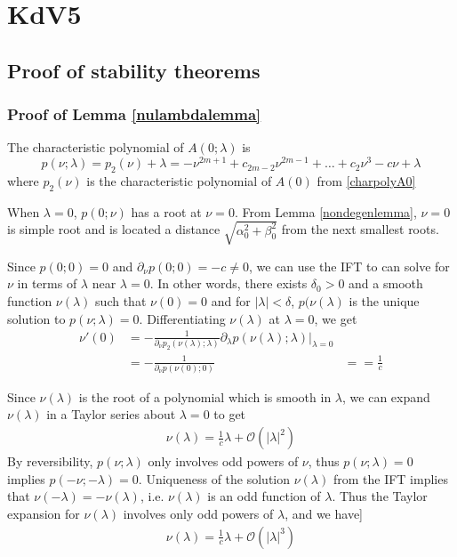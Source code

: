 \documentclass[thesis.tex]{subfiles}
\begin{document}
\iffulldocument\else
	\chapter{KdV5}
\fi

\section{Proof of stability theorems} 

\subsection{Proof of Lemma \ref{nulambdalemma}}

The characteristic polynomial of $A(0; \lambda)$ is
\begin{equation}\label{charpolyA0lambda}
p(\nu; \lambda) = p_2(\nu) + \lambda = -\nu^{2m+1} + c_{2m-2} \nu^{2m-1} + \dots + c_2 \nu^3 - c \nu + \lambda
\end{equation}
where $p_2(\nu)$ is the characteristic polynomial of $A(0)$ from \eqref{charpolyA0}

When $\lambda = 0$, $p(0; \nu)$ has a root at $\nu = 0$. From Lemma \ref{nondegenlemma}, $\nu = 0$ is simple root and is located a distance $\sqrt{\alpha_0^2 + \beta_0^2}$ from the next smallest roots. 

Since $p(0; 0) = 0$ and $\partial_\nu p(0; 0) = -c \neq 0$, we can use the IFT to can solve for $\nu$ in terms of $\lambda$ near $\lambda = 0$. In other words, there exists $\delta_0 > 0$ and a smooth function $\nu(\lambda)$ such that $\nu(0) = 0$ and for $|\lambda| < \delta$, $p(\nu(\lambda)$ is the unique solution to $p(\nu; \lambda) = 0$. Differentiating $\nu(\lambda)$ at $\lambda = 0$, we get
\begin{align*}
\nu'(0) &= -\frac{1}{\partial_\nu p_2(\nu(\lambda); \lambda) } \partial_\lambda p ( \nu(\lambda); \lambda ) \Big|_{\lambda = 0}\\
&= -\frac{1}{\partial_\nu p(\nu(0); 0) } 
&= = \frac{1}{c}
\end{align*}

Since $\nu(\lambda)$ is the root of a polynomial which is smooth in $\lambda$, we can expand $\nu(\lambda)$ in a Taylor series about $\lambda = 0$ to get
\begin{align*}
\nu(\lambda) = \frac{1}{c} \lambda + \mathcal{O}(|\lambda|^2)
\end{align*}
By reversibility, $p(\nu; \lambda)$ only involves odd powers of $\nu$, thus $p(\nu; \lambda) = 0$ implies $p(-\nu; -\lambda) = 0$. Uniqueness of the solution $\nu(\lambda)$ from the IFT implies that $\nu(-\lambda) = -\nu(\lambda)$, i.e. $\nu(\lambda)$ is an odd function of $\lambda$. Thus the Taylor expansion for $\nu(\lambda)$ involves only odd powers of $\lambda$, and we have]
\begin{align*}
\nu(\lambda) = \frac{1}{c} \lambda + \mathcal{O}(|\lambda|^3)
\end{align*}
\end{document}
